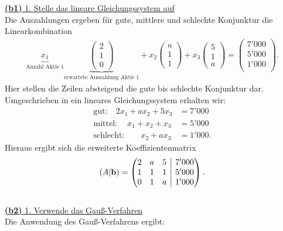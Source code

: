\underline{\textbf{(b1)} 1. Stelle das lineare Gleichungssystem auf}\\
Die Auszahlungen ergeben für gute, mittlere und schlechte Konjunktur die Linearkombination
\begin{align*}
	\underbrace{x_1}_{\textrm{Anzahl Aktie 1}}
	\underbrace{\begin{pmatrix}
		2 \\ 1 \\ 0
	\end{pmatrix}}_{\textrm{erwartete Auszahlung  Aktie 1}}
	+
	x_2 
	\begin{pmatrix}
		a \\ 1 \\ 1
	\end{pmatrix}
	+
	x_3
	\begin{pmatrix}
		5 \\ 1 \\ a
	\end{pmatrix}
	= 
	\begin{pmatrix}
		7'000\\
		5'000\\
		1'000\\
	\end{pmatrix}.
\end{align*}
Hier stellen die Zeilen absteigend die gute bis schlechte Konjunktur dar. Umgeschrieben in ein lineares Gleichungssystem erhalten wir:
\begin{align*}
	\textrm{gut:} \quad 2 x_1 + a x_2 + 5 x_3 &= 7'000\\
	\textrm{mittel:} \quad  \ x_1 + x_2 + x_3  &= 5'000\\
	\textrm{schlecht: } \quad \ \ \ x_2 + a x_3 &= 1'000.
\end{align*}
Hieraus ergibt sich die erweiterte Koeffizientenmatrix
\begin{align*}
	(A | \mathbf{b})
	=
	\begin{pmatrix}
		2 & a & 5 & \BAR & 7'000\\
		1 & 1 & 1 & \BAR & 5'000\\
		0 & 1 & a & \BAR & 1'000
	\end{pmatrix}.
\end{align*}
\ \\
\underline{\textbf{(b2)} 1. Verwende das Gauß-Verfahren}\\
Die Anwendung des Gauß-Verfahrens ergibt:
